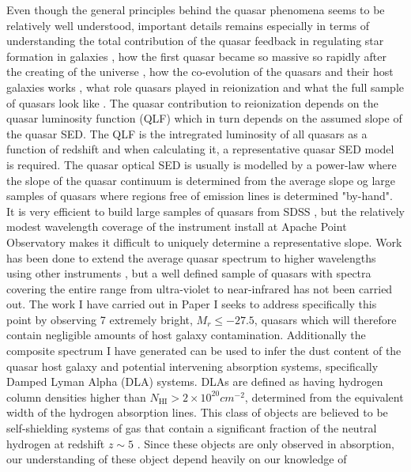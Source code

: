 Even though the general principles behind the quasar phenomena seems to be
relatively well understood, important details remains especially in terms of
understanding the total contribution of the quasar feedback in regulating star
formation in galaxies \citep{DiMatteo2005}, how the first quasar became so
massive so rapidly after the creating of the universe \cite{Wu2015a}, how the
co-evolution of the quasars and their host galaxies works \citep{Ferrarese2000},
what role quasars played in reionization \citep{Hopkins2007} and what the full
sample of quasars look like \citep{Krawczyk2015}. The quasar contribution to
reionization depends on the quasar luminosity function (QLF) which in turn
depends on the assumed slope of the quasar SED. The QLF is the intregrated
luminosity of all quasars as a function of redshift and when calculating it, a
representative quasar SED model is required. The quasar optical SED is usually
is modelled by a power-law where the slope of the quasar continuum is determined
from the average slope og large samples of quasars \citep{Vandenberk2001,
Richards2006a, Shen2011, Lusso2015} where regions free of emission lines is
determined "by-hand". It is very efficient to build large samples of quasars
from SDSS \citep{Paris2014}, but the relatively modest wavelength coverage of
the instrument install at Apache Point Observatory \citep{Gunn2006} makes it
difficult to uniquely determine a representative slope. Work has been done to
extend the average quasar spectrum to higher wavelengths using other instruments
\citep{Glikman2006}, but a well defined sample of quasars with spectra covering
the entire range from ultra-violet to near-infrared has not been carried out.
The work I have carried out in Paper I seeks to address specifically this point
by observing 7 extremely bright, $M_{r} \leq -27.5$, quasars which will
therefore contain negligible amounts of host galaxy contamination. Additionally
the composite spectrum I have generated can be used to infer the dust content of
the quasar host galaxy and potential intervening absorption systems,
specifically Damped Lyman Alpha (DLA) systems. DLAs are defined as having
hydrogen column densities higher than $N_{\mathrm{HI}} > 2 \times 10^{20}
cm^{-2}$, determined from the equivalent width of the hydrogen absorption lines.
This class of objects are believed to be self-shielding systems of gas that
contain a significant fraction of the neutral hydrogen at redshift $z \sim 5$
\citep{StorrieLombardi2000}. Since these objects are only observed in
absorption, our understanding of these object depend heavily on our knowledge of
